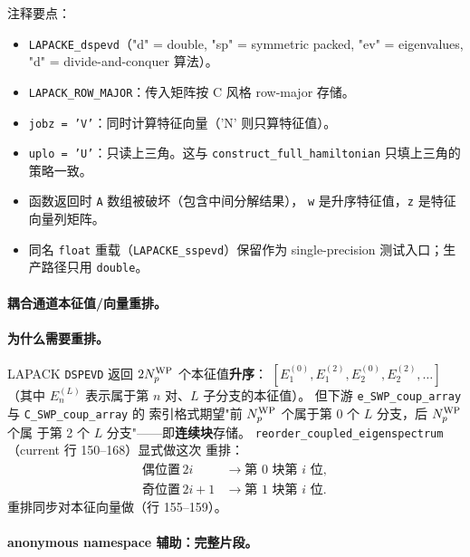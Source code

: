 注释要点：
\begin{itemize}
  \item \texttt{LAPACKE\_dspevd}（"d" = double, "sp" = symmetric packed,
        "ev" = eigenvalues, "d" = divide-and-conquer 算法）。
  \item \texttt{LAPACK\_ROW\_MAJOR}：传入矩阵按 C 风格 row-major 存储。
  \item \texttt{jobz = 'V'}：同时计算特征向量（'N' 则只算特征值）。
  \item \texttt{uplo = 'U'}：只读上三角。这与
        \texttt{construct\_full\_hamiltonian} 只填上三角的策略一致。
  \item 函数返回时 \texttt{A} 数组被破坏（包含中间分解结果），
        \texttt{w} 是升序特征值，\texttt{z} 是特征向量列矩阵。
  \item 同名 \texttt{float} 重载（\texttt{LAPACKE\_sspevd}）保留作为
        single-precision 测试入口；生产路径只用 \texttt{double}。
\end{itemize}

\paragraph{耦合通道本征值/向量重排。}


\paragraph{为什么需要重排。}
LAPACK \texttt{DSPEVD} 返回 \(2{N_{p}^{\text{WP}}}\) 个本征值\textbf{升序}：
\([E_1^{(0)}, E_1^{(2)}, E_2^{(0)}, E_2^{(2)}, \ldots]\)（其中
\(E_n^{(L)}\) 表示属于第 \(n\) 对、\(L\) 子分支的本征值）。
但下游 \texttt{e\_SWP\_coup\_array} 与 \texttt{C\_SWP\_coup\_array} 的
索引格式期望"前 \({N_{p}^{\text{WP}}}\) 个属于第 0 个 \(L\) 分支，后 \({N_{p}^{\text{WP}}}\) 个属
于第 2 个 \(L\) 分支"——即\textbf{连续块}存储。
\texttt{reorder\_coupled\_eigenspectrum}（current 行 150--168）显式做这次
重排：
\begin{align*}
\text{偶位置}\,2i &\to \text{第 0 块第 } i \text{ 位}, \\
\text{奇位置}\,2i+1 &\to \text{第 1 块第 } i \text{ 位}.
\end{align*}
重排同步对本征向量做（行 155--159）。

\paragraph{anonymous namespace 辅助：完整片段。}


